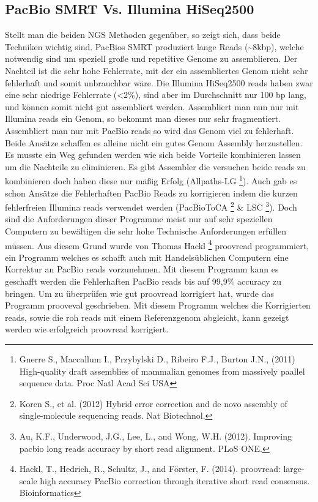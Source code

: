 \documentclass{scrartcl}
\begin{document}
\subsection{PacBio SMRT Vs. Illumina HiSeq2500}
\label{sec-3-2}
Stellt man die beiden NGS Methoden gegenüber, so zeigt sich, dass beide Techniken wichtig sind.
PacBios SMRT produziert lange Reads (\textasciitilde{}8kbp), welche notwendig 
sind um speziell große und repetitive Genome zu assemblieren. Der Nachteil ist die sehr hohe Fehlerrate, mit der ein assembliertes Genom 
nicht sehr fehlerhaft und somit unbrauchbar wäre. Die Illumina HiSeq2500 reads haben zwar eine sehr niedrige Fehlerrate (<2\%), sind aber im Durchschnitt nur 100 bp
lang, und können somit nicht gut assembliert werden. Assembliert man nun nur mit Illumina reads ein Genom, so bekommt man dieses nur sehr fragmentiert. 
Assembliert man nur mit PacBio reads so wird das Genom viel zu fehlerhaft. 
Beide Ansätze schaffen es alleine nicht ein gutes Genom Assembly herzustellen.
Es musste ein Weg gefunden werden wie sich beide Vorteile kombinieren lassen um die Nachteile zu eliminieren. Es gibt Assembler die 
versuchen beide reads zu kombinieren doch haben diese nur mäßig Erfolg (Allpaths-LG \footnote{Gnerre S., Maccallum I., Przybylski D., Ribeiro F.J., Burton J.N., (2011)
High-quality draft assemblies of mammalian genomes from massively paallel sequence data. Proc Natl Acad Sci USA}).
Auch gab es schon Ansätze die Fehlerhaften PacBio Reads zu korrigieren indem die kurzen fehlerfreien Illumina reads verwendet werden (PacBioToCA \footnote{Koren S., et al. (2012) 
Hybrid error correction and de novo assembly of single-molecule sequencing reads. Nat Biotechnol.} \& LSC \footnote{Au, K.F., Underwood, J.G., Lee, L., and Wong, W.H. (2012).
Improving pacbio long reads accuracy by short read alignment. PLoS ONE.}). 
Doch sind die Anforderungen dieser Programme
meist nur auf sehr speziellen Computern zu bewältigen die sehr hohe Technische Anforderungen erfüllen müssen. Aus diesem Grund wurde
von Thomas Hackl \footnote{Hackl, T., Hedrich, R., Schultz, J., and Förster, F. (2014).
proovread: large-scale high accuracy PacBio correction through iterative short read consensus. Bioinformatics} proovread programmiert, ein Programm welches es schafft auch mit Handelsüblichen Computern eine Korrektur an PacBio reads
vorzunehmen. Mit diesem Programm kann es geschafft werden die Fehlerhaften PacBio reads bis auf 99,9\% accuracy zu bringen. Um zu überprüfen
wie gut proovread korrigiert hat, wurde das Programm prooveval geschrieben. Mit diesem Programm welches die Korrigierten reads, sowie die roh reads
mit einem Referenzgenom abgleicht, kann gezeigt werden wie erfolgreich proovread korrigiert.
\end{document}
